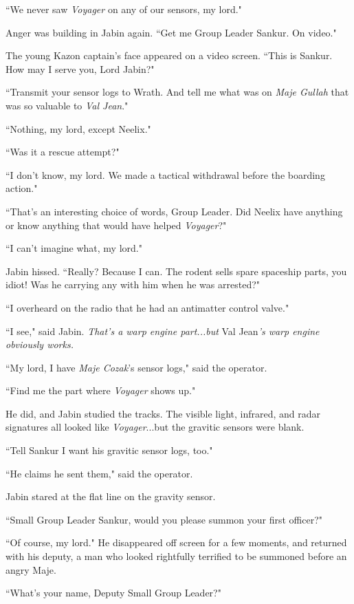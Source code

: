\documentclass[twoside,letterpaper,12pt]{memoir}
\begin{document}
``We never saw \textit{Voyager} on any of our sensors, my lord."

Anger was building in Jabin again. ``Get me Group Leader Sankur. On video."

The young Kazon captain's face appeared on a video screen. ``This is Sankur. How may I serve you, Lord Jabin?"

``Transmit your sensor logs to Wrath. And tell me what was on \textit{Maje Gullah} that was so valuable to \textit{Val Jean}."

``Nothing, my lord, except Neelix."

``Was it a rescue attempt?"

``I don't know, my lord. We made a tactical withdrawal before the boarding action."

``That's an interesting choice of words, Group Leader. Did Neelix have anything or know anything that would have helped \textit{Voyager}?"

``I can't imagine what, my lord."

Jabin hissed. ``Really? Because I can. The rodent sells spare spaceship parts, you idiot! Was he carrying any with him when he was arrested?"

``I overheard on the radio that he had an antimatter control valve."

``I see," said Jabin. \textit{That's a warp engine part...but }Val Jean\textit{'s warp engine obviously works.}

``My lord, I have \textit{Maje Cozak}'s sensor logs," said the operator.

``Find me the part where \textit{Voyager} shows up."

He did, and Jabin studied the tracks. The visible light, infrared, and radar signatures all looked like \textit{Voyager}...but the gravitic sensors were blank.

``Tell Sankur I want his gravitic sensor logs, too."

``He claims he sent them," said the operator.

Jabin stared at the flat line on the gravity sensor.

``Small Group Leader Sankur, would you please summon your first officer?"

``Of course, my lord." He disappeared off screen for a few moments, and returned with his deputy, a man who looked rightfully terrified to be summoned before an angry Maje.

``What's your name, Deputy Small Group Leader?"
\end{document}
